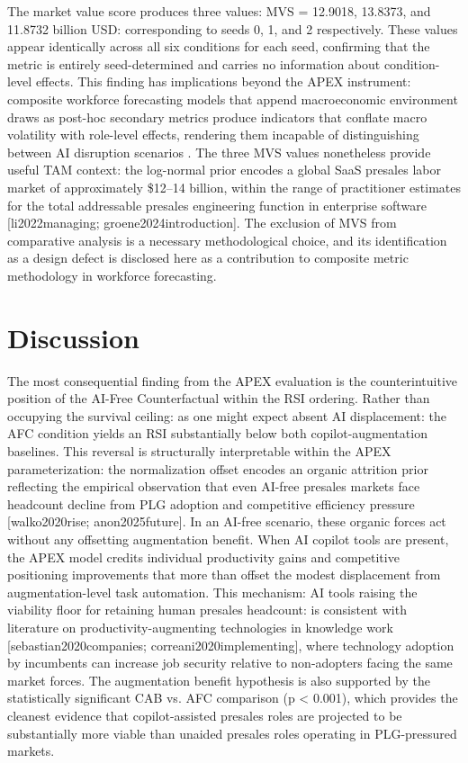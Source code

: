 \documentclass[10pt, conference]{IEEEtran}
\begin{document}
\label{sec:secondary_metric_findings}

The market value score produces three values: MVS = 12.9018, 13.8373, and 11.8732 billion USD: corresponding to seeds 0, 1, and 2 respectively. These values appear identically across all six conditions for each seed, confirming that the metric is entirely seed-determined and carries no information about condition-level effects. This finding has implications beyond the APEX instrument: composite workforce forecasting models that append macroeconomic environment draws as post-hoc secondary metrics produce indicators that conflate macro volatility with role-level effects, rendering them incapable of distinguishing between AI disruption scenarios \cite{virtanen2020scipy}. The three MVS values nonetheless provide useful TAM context: the log-normal prior encodes a global SaaS presales labor market of approximately \$12--14 billion, within the range of practitioner estimates for the total addressable presales engineering function in enterprise software [li2022managing; groene2024introduction]. The exclusion of MVS from comparative analysis is a necessary methodological choice, and its identification as a design defect is disclosed here as a contribution to composite metric methodology in workforce forecasting.

\section{Discussion}

\label{sec:discussion}

The most consequential finding from the APEX evaluation is the counterintuitive position of the AI-Free Counterfactual within the RSI ordering. Rather than occupying the survival ceiling: as one might expect absent AI displacement: the AFC condition yields an RSI substantially below both copilot-augmentation baselines. This reversal is structurally interpretable within the APEX parameterization: the normalization offset encodes an organic attrition prior reflecting the empirical observation that even AI-free presales markets face headcount decline from PLG adoption and competitive efficiency pressure [walko2020rise; anon2025future]. In an AI-free scenario, these organic forces act without any offsetting augmentation benefit. When AI copilot tools are present, the APEX model credits individual productivity gains and competitive positioning improvements that more than offset the modest displacement from augmentation-level task automation. This mechanism: AI tools raising the viability floor for retaining human presales headcount: is consistent with literature on productivity-augmenting technologies in knowledge work [sebastian2020companies; correani2020implementing], where technology adoption by incumbents can increase job security relative to non-adopters facing the same market forces. The augmentation benefit hypothesis is also supported by the statistically significant CAB vs. AFC comparison (p < 0.001), which provides the cleanest evidence that copilot-assisted presales roles are projected to be substantially more viable than unaided presales roles operating in PLG-pressured markets.
\end{document}
